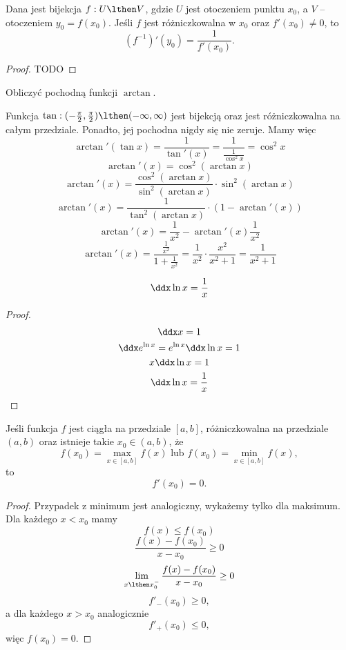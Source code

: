 \documentclass[11pt]{scrartcl}
\begin{document}
    \begin{theorem}
        Dana jest bijekcja $f: U \lthen V$, gdzie $U$ jest otoczeniem punktu $x_0$, a $V$ -- otoczeniem $y_0 = f(x_0)$. Jeśli $f$ jest różniczkowalna w $x_0$ oraz $f'(x_0) \neq 0$, to
        \[ \left(f^{-1}\right)'(y_0) = \frac{1}{f'(x_0)}. \]
    \end{theorem}
    \begin{proof}
        TODO
    \end{proof}

    \begin{example}
        Obliczyć pochodną funkcji $\arctan$.
    \end{example}
    \begin{solution}
        Funkcja $\tan : (-\frac{\pi}{2}, \frac{\pi}{2}) \lthen (-\infty, \infty)$ jest bijekcją oraz jest różniczkowalna na całym przedziale. Ponadto, jej pochodna nigdy się nie zeruje. Mamy więc
        \[ \arctan'(\tan x) = \frac{1}{\tan'(x)} = \frac{1}{\frac{1}{\cos^2 x}} = \cos^2 x \]
        \[ \arctan'(x) = \cos^2(\arctan x) \]
        \[ \arctan'(x) = \frac{\cos^2(\arctan x)}{\sin^2(\arctan x)} \cdot \sin^2(\arctan x) \]
        \[ \arctan'(x) = \frac{1}{\tan^2(\arctan x)} \cdot (1 - \arctan'(x)) \]
        \[ \arctan'(x) = \frac{1}{x^2} - \arctan'(x)\frac{1}{x^2} \]
        \[ \arctan'(x) = \frac{\frac{1}{x^2}}{1 + \frac{1}{x^2}} = \frac{1}{x^2}\cdot\frac{x^2}{x^2 + 1} = \frac{1}{x^2 + 1} \]
    \end{solution}

    \begin{theorem}
        \[ \ddx \ln x = \frac{1}{x} \]
    \end{theorem}
    \begin{proof}
        \begin{gather*}
            \ddx x = 1 \\
            \ddx e^{\ln x} = e^{\ln x} \ddx \ln x = 1 \\
            x \ddx \ln x = 1 \\
            \ddx \ln x = \frac{1}{x}
        \end{gather*}
    \end{proof}

    \begin{theorem}
        \label{t:zero derivative in extremum}
        Jeśli funkcja $f$ jest ciągła na przedziale $[a, b]$, różniczkowalna na przedziale $(a, b)$ oraz istnieje takie $x_0 \in (a, b)$, że
        \[ f(x_0) = \max_{x \in [a, b]} f(x) \text{ lub } f(x_0) = \min_{x \in [a, b]} f(x), \]
        to
        \[ f'(x_0) = 0. \]
    \end{theorem}
    \begin{proof}
        Przypadek z minimum jest analogiczny, wykażemy tylko dla maksimum. Dla każdego $x < x_0$ mamy
        \[ f(x) \leq f(x_0) \]
        \[ \frac{f(x) - f(x_0)}{x - x_0} \geq 0 \]
        \[ \lim_{x\lthen x_0^-}\frac{f(x) - f(x_0)}{x - x_0} \geq 0 \]
        \[ f'_-(x_0) \geq 0, \]
        a dla każdego $x > x_0$ analogicznie
        \[ f'_+(x_0) \leq 0, \]
        więc $f(x_0) = 0$.
    \end{proof}
\end{document}
